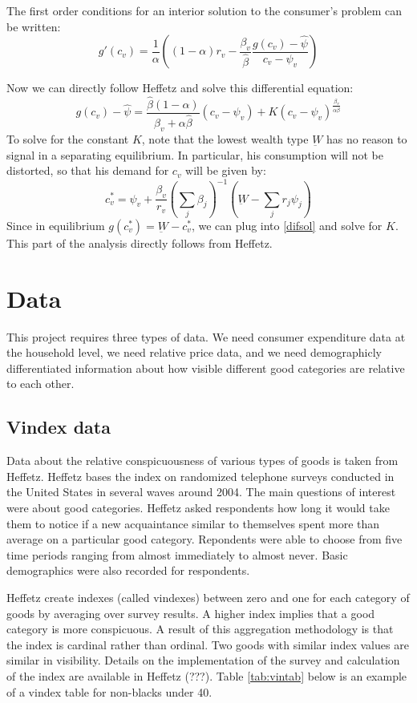 \documentclass{article}
\begin{document}
The first order conditions for an interior solution to the consumer's problem can be written:
\begin{equation}
g'(c_v) = \frac{1}{\alpha}\left( \left( 1-\alpha\right) r_v - \frac{\beta_v}{\hat{\beta}}\frac{g(c_v)-\hat{\psi}}{c_v - \psi_v}\right)
\end{equation}

Now we can directly follow Heffetz and solve this differential equation:
\begin{equation}
	\label{difsol}
	g(c_v) - \hat{\psi} = \frac{\hat{\beta}\left(1-\alpha\right)}{\beta_v +\alpha \hat{\beta}} \left(c_v-\psi_v\right) + K\left(c_v-\psi_v\right)^{\frac{\beta_v}{\alpha \hat{\beta}}}
\end{equation}
To solve for the constant $K$, note that the lowest wealth type $\underbar{W}$ has no reason to signal in a separating equilibrium.
In particular, his consumption will not be distorted, so that his demand for $c_v$ will be given by:
\[
c_v^* = \psi_v + \frac{\beta_v}{r_v}\left(\sum_{j} \beta_j\right)^{-1}\left(\underbar{W} - \sum_{j} r_j \psi_j\right)
\]
Since in equilibrium $g(c_v^*) = \underbar{W} - c_v^*$, we can plug into \eqref{difsol} and solve for $K$.
This part of the analysis directly follows from Heffetz.
\section{Data}
This project requires three types of data.  We need consumer expenditure data at the household level, we need relative price data, and we need demographicly differentiated information about how visible different good categories are relative to each other. 
\subsection{Vindex data}
Data about the relative  conspicuousness of  various types of goods is taken from Heffetz.  
Heffetz bases the index on randomized telephone surveys conducted in the United States in several waves around 2004.
The main questions of interest were about good categories.
Heffetz asked respondents how long it would take them to notice if a new acquaintance similar to themselves spent more than average on a particular good category.
Repondents were able to choose from five time periods ranging from almost immediately to almost never.  
Basic demographics were also recorded for respondents.  

Heffetz create indexes (called vindexes) between zero and one for each category of goods by averaging over survey results.  
A higher index implies that a good category is  more conspicuous. 
A result of this aggregation methodology is that the index is cardinal rather than ordinal.  Two goods with similar index values are similar in visibility.  Details on the implementation of the survey and calculation of the index are available in Heffetz (???).
Table \ref{tab:vintab} below is an example of a vindex table for non-blacks under 40.
\end{document}

